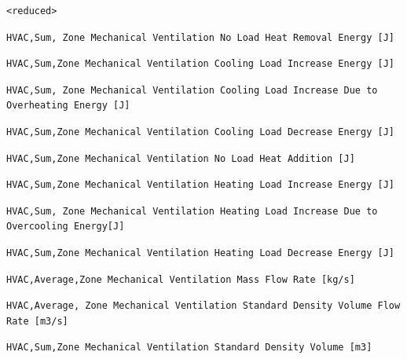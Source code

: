 \begin{lstlisting}
<reduced>
\end{lstlisting}

\begin{lstlisting}
HVAC,Sum, Zone Mechanical Ventilation No Load Heat Removal Energy [J]
\end{lstlisting}

\begin{lstlisting}
HVAC,Sum,Zone Mechanical Ventilation Cooling Load Increase Energy [J]
\end{lstlisting}

\begin{lstlisting}
HVAC,Sum, Zone Mechanical Ventilation Cooling Load Increase Due to Overheating Energy [J]
\end{lstlisting}

\begin{lstlisting}
HVAC,Sum,Zone Mechanical Ventilation Cooling Load Decrease Energy [J]
\end{lstlisting}

\begin{lstlisting}
HVAC,Sum,Zone Mechanical Ventilation No Load Heat Addition [J]
\end{lstlisting}

\begin{lstlisting}
HVAC,Sum,Zone Mechanical Ventilation Heating Load Increase Energy [J]
\end{lstlisting}

\begin{lstlisting}
HVAC,Sum, Zone Mechanical Ventilation Heating Load Increase Due to Overcooling Energy[J]
\end{lstlisting}

\begin{lstlisting}
HVAC,Sum,Zone Mechanical Ventilation Heating Load Decrease Energy [J]
\end{lstlisting}

\begin{lstlisting}
HVAC,Average,Zone Mechanical Ventilation Mass Flow Rate [kg/s]
\end{lstlisting}

\begin{lstlisting}
HVAC,Average, Zone Mechanical Ventilation Standard Density Volume Flow Rate [m3/s]
\end{lstlisting}

\begin{lstlisting}
HVAC,Sum,Zone Mechanical Ventilation Standard Density Volume [m3]
\end{lstlisting}


